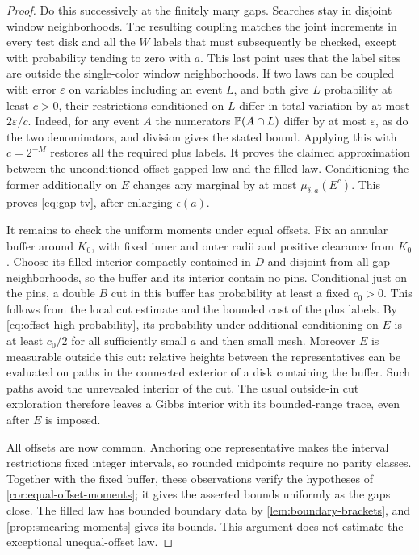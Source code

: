 \begin{proof}
Do this successively at the finitely many gaps.  Searches stay in
disjoint window neighborhoods.  The resulting coupling matches
the joint increments in every test disk and all the $W$ labels
that must subsequently be checked, except with probability
tending to zero with $a$.  This last point uses that the label
sites are outside the single-color window neighborhoods.  If two
laws can be coupled with error $\varepsilon$ on variables
including an event $L$, and both give $L$ probability at least
$c>0$, their restrictions conditioned on $L$ differ in total
variation by at most $2\varepsilon/c$.  Indeed, for any event
$A$ the numerators $\mathbb P(A\cap L)$ differ by at most
$\varepsilon$, as do the two denominators, and division gives
the stated bound.  Applying this with $c=2^{-M}$ restores all
the required plus labels.  It proves the claimed approximation
between the unconditioned-offset gapped law and the filled law.
Conditioning the former additionally on $E$ changes any marginal
by at most $\mu_{\delta,a}(E^c)$.  This proves
\eqref{eq:gap-tv}, after enlarging $\epsilon(a)$.

It remains to check the uniform moments under equal offsets.
Fix an annular buffer around $K_0$, with fixed inner and outer
radii and positive clearance from $K_0$.  Choose its filled
interior compactly contained in $D$ and disjoint from all gap
neighborhoods, so the buffer and its interior contain no pins.
Conditional just on the pins, a
double $B$ cut in this buffer has probability at least a fixed
$c_0>0$.  This follows from the local cut estimate and the
bounded cost of the plus labels.  By
\eqref{eq:offset-high-probability}, its probability under
additional conditioning on $E$ is at least $c_0/2$ for all
sufficiently small $a$ and then small mesh.  Moreover $E$ is
measurable outside this cut: relative heights between the
representatives can be evaluated on paths in the connected
exterior of a disk containing the buffer.  Such paths avoid the
unrevealed interior of the cut.  The usual outside-in cut
exploration therefore leaves a Gibbs interior with its
bounded-range trace, even after $E$ is imposed.

All offsets are now common.  Anchoring one representative makes
the interval restrictions fixed integer intervals, so rounded
midpoints require no parity classes.  Together with the fixed
buffer, these observations verify the hypotheses of
\cref{cor:equal-offset-moments}; it
gives the asserted bounds uniformly as the gaps close.  The
filled law has bounded boundary data by
\cref{lem:boundary-brackets}, and
\cref{prop:smearing-moments} gives its bounds.  This argument
does not estimate the exceptional unequal-offset law.
\end{proof}

